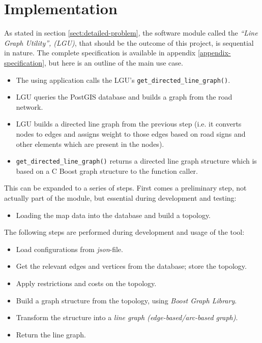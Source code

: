 \documentclass[../main.tex]{subfiles}
\begin{document}
\chapter{Implementation}
As stated in section \ref{sect:detailed-problem}, the software module called the \textit{``Line Graph Utility'', (LGU)}, that should be the outcome of this project, is sequential in nature. The complete specification is available in appendix \ref{appendix-specification}, but here is an outline of the main use case.

\begin{itemize}
    \item The using application calls the LGU's \texttt{get\_directed\_line\_graph()}.
    \item LGU queries the PostGIS database and builds a graph from the road network.
    \item LGU builds a directed line graph from the previous step (i.e. it converts nodes to edges and assigns weight to those edges based on road signs and other elements which are present in the nodes).
    \item \texttt{get\_directed\_line\_graph()} returns a directed line graph structure which is based on a C Boost graph structure to the function caller.
\end{itemize}

\vspace{1em}
\noindent
This can be expanded to a series of steps. First comes a preliminary step, not actually part of the module, but essential during development and testing:

\begin{itemize}
    \item Loading the map data into the database and build a topology.
\end{itemize} 

\vspace{1em}
\noindent
The following steps are performed during development and usage of the tool:

\begin{itemize}
    \item Load configurations from \emph{json}-file.
    \item Get the relevant edges and vertices from the database; store the topology.
    \item Apply restrictions and costs on the topology.
    \item Build a graph structure from the topology, using \emph{Boost Graph Library}.
    \item Transform the structure into a \emph{line graph (edge-based/arc-based graph)}.
    \item Return the line graph.
\end{itemize}
\end{document}
